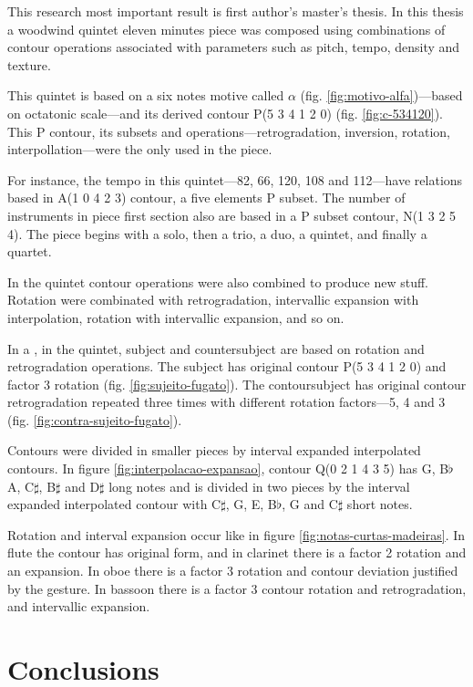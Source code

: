 This research most important result is first author's master's
thesis. In this thesis a woodwind quintet eleven minutes piece was
composed using combinations of contour operations associated with
parameters such as pitch, tempo, density and texture.

This quintet is based on a six notes motive called $\alpha$
(fig. \ref{fig:motivo-alfa})---based on octatonic scale---and its
derived contour P(5 3 4 1 2 0) (fig. \ref{fig:c-534120}). This P
contour, its subsets and operations---retrogradation, inversion,
rotation, interpollation---were the only used in the piece.

For instance, the tempo in this quintet---82, 66, 120, 108 and
112---have relations based in A(1 0 4 2 3) contour, a five elements P
subset. The number of instruments in piece first section also are
based in a P subset contour, N(1 3 2 5 4). The piece begins with a
solo, then a trio, a duo, a quintet, and finally a quartet.

In the quintet contour operations were also combined to produce new
stuff. Rotation were combinated with retrogradation, intervallic
expansion with interpolation, rotation with intervallic expansion, and
so on.

In a , in the quintet, subject and countersubject are based
on rotation and retrogradation operations. The subject has original
contour P(5 3 4 1 2 0) and factor 3 rotation
(fig. \ref{fig:sujeito-fugato}). The contoursubject has original
contour retrogradation repeated three times with different rotation
factors---5, 4 and 3 (fig. \ref{fig:contra-sujeito-fugato}).

Contours were divided in smaller pieces by interval expanded
interpolated contours. In figure \ref{fig:interpolacao-expansao},
contour Q(0 2 1 4 3 5) has G, B$\flat$ A, C$\sharp$, B$\sharp$ and
D$\sharp$ long notes and is divided in two pieces by the interval
expanded interpolated contour with C$\sharp$, G, E, B$\flat$, G and
C$\sharp$ short notes.

Rotation and interval expansion occur like in figure
\ref{fig:notas-curtas-madeiras}. In flute the contour has original
form, and in clarinet there is a factor 2 rotation and an
expansion. In oboe there is a factor 3 rotation and contour deviation
justified by the gesture. In bassoon there is a factor 3 contour
rotation and retrogradation, and intervallic expansion.

\section{Conclusions}
\label{sec:conclusions}

